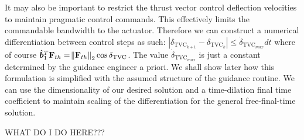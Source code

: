 It may also be important to restrict the thrust vector control deflection velocities to maintain pragmatic control commands. This effectively limits the commandable bandwidth to the actuator. Therefore we can construct a numerical differentiation between control steps as such: $|{\delta_{\text{TVC}_{k+1}} - \delta_{\text{TVC}_{k}}}| \leq \dot{\delta}_{\text{TVC}_{max}}dt$ where of course $\hat{\bm{b}}_1^T\mathbf{F}_{th} = \norm{\mathbf{F}_{th}}_2\cos{\delta_{\text{TVC}}}$. The value $\dot{\delta}_{\text{TVC}_{max}}$ is just a constant determined by the guidance engineer a priori. We shall show later how this formulation is simplified with the assumed structure of the guidance routine. We can use the dimensionality of our desired solution and a time-dilation final time coefficient to maintain scaling of the differentiation for the general free-final-time solution.


WHAT DO I DO HERE???

%
